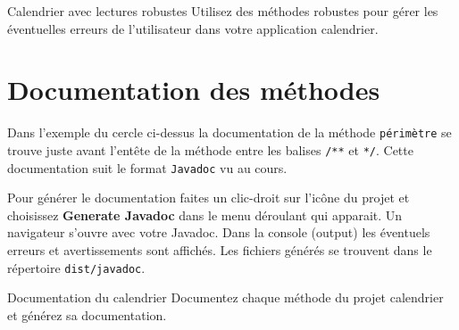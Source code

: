 \documentclass[a4paper,11pt]{article}
\begin{document}
	\begin{Exercice}{Calendrier avec lectures robustes}
		Utilisez des méthodes robustes pour gérer les éventuelles erreurs de l'utilisateur dans votre application calendrier.
	\end{Exercice}


\section{Documentation des méthodes}

	Dans l'exemple du cercle ci-dessus la documentation de la méthode \texttt{périmètre} 
	se trouve juste avant l'entête de la méthode entre les balises \texttt{/**} et \texttt{*/}.
	Cette documentation suit le format \texttt{Javadoc} vu au cours.
	
	Pour générer le documentation faites un clic-droit sur l'icône du projet et choisissez 
	\textbf{Generate Javadoc} dans le menu déroulant qui apparait. 
	Un navigateur s'ouvre avec votre Javadoc. Dans la console (output) les éventuels 
	erreurs et avertissements sont affichés.
	Les fichiers générés se trouvent dans le répertoire \texttt{dist/javadoc}.
	

	\begin{Exercice}{Documentation du calendrier}
		Documentez chaque méthode du projet calendrier et générez sa documentation.
	\end{Exercice}

	
				
\end{document}
